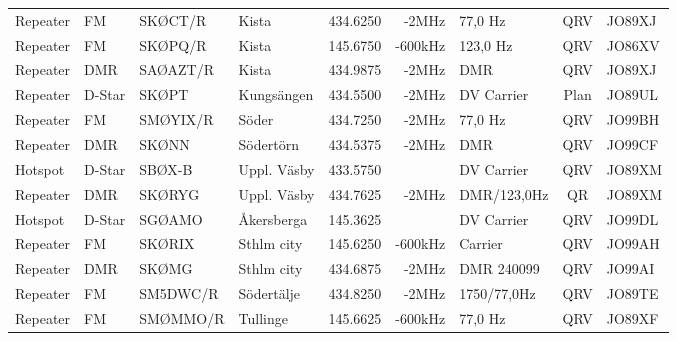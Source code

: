 \begin{landscape}
\begin{longtable}{llllrrlcl}
	Repeater           & FM           & SKØCT/R       & Kista        &          434.6250 &          -2MHz & 77,0 Hz         &       QRV       & JO89XJ           \\
	Repeater           & FM           & SKØPQ/R       & Kista        &          145.6750 &        -600kHz & 123,0 Hz        &       QRV       & JO86XV           \\
	Repeater           & DMR          & SAØAZT/R      & Kista        &          434.9875 &          -2MHz & DMR             &       QRV       & JO89XJ           \\
	Repeater           & D-Star       & SKØPT         & Kungsängen   &          434.5500 &          -2MHz & DV Carrier      &      Plan       & JO89UL           \\
	Repeater           & FM           & SMØYIX/R      & Söder        &          434.7250 &          -2MHz & 77,0 Hz         &       QRV       & JO99BH           \\
	Repeater           & DMR          & SKØNN         & Södertörn    &          434.5375 &          -2MHz & DMR             &       QRV       & JO99CF           \\
	Hotspot            & D-Star       & SBØX-B        & Uppl. Väsby  &          433.5750 &                & DV Carrier      &       QRV       & JO89XM           \\
	Repeater           & DMR          & SKØRYG        & Uppl. Väsby  &          434.7625 &          -2MHz & DMR/123,0Hz     &       QR        & JO89XM           \\
	Hotspot            & D-Star       & SGØAMO        & Åkersberga   &          145.3625 &                & DV Carrier      &       QRV       & JO99DL           \\
	Repeater           & FM           & SKØRIX        & Sthlm city   &          145.6250 &        -600kHz & Carrier         &       QRV       & JO99AH           \\
	Repeater           & DMR          & SKØMG         & Sthlm city   &          434.6875 &          -2MHz & DMR 240099      &       QRV       & JO99AI           \\
	Repeater           & FM           & SM5DWC/R      & Södertälje   &          434.8250 &          -2MHz & 1750/77,0Hz     &       QRV       & JO89TE           \\
	Repeater           & FM           & SMØMMO/R      & Tullinge     &          145.6625 &        -600kHz & 77,0 Hz         &       QRV       & JO89XF           \\

\end{longtable}
\end{landscape}
